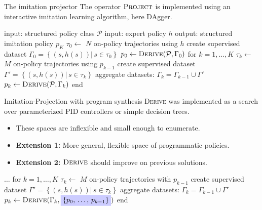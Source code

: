 \begin{frame}[fragile]{The imitation projector}
The operator $\textsc{Project}$ is implemented using an interactive imitation learning algorithm, here DAgger.

\begin{algorithm}[caption={$\textsc{Project}$: imitation learning}]
 input: structured policy class $\mathcal{P}$
 input: expert policy $h$
 output: structured imitation policy $p_K$
 $\tau_0 \leftarrow $ $N$ on-policy trajectories using $h$
 create supervised dataset $\Gamma_0 = \left\{\left(s, h(s)\right) |\, s \in \tau_0 \right\}$
 $p_0 \leftarrow \textsc{Derive}(\mathcal{P}, \Gamma_0)$
 for $k = 1, \dots, K$
   $\tau_k \leftarrow $ $M$ on-policy trajectories using $p_{k-1}$
   create supervised dataset $\Gamma' = \left\{\left(s, h(s)\right) |\, s \in \tau_k \right\}$
   aggregate datasets: $\Gamma_k = \Gamma_{k-1} \cup \Gamma' \quad$
   $p_k \leftarrow \textsc{Derive}(\mathcal{P}, \Gamma_k)$
 end
\end{algorithm}

\end{frame}




\begin{frame}[fragile]{Imitation-Projection with program synthesis}
\textsc{Derive} was implemented as a search over parameterized PID controllers or simple decision trees.

\begin{itemize}
    \item These spaces are inflexible and small enough to enumerate.
    \item \textbf{Extension 1:} More general, flexible space of programmatic policies.
    \item \textbf{Extension 2:} $\textsc{Derive}$ should improve on previous solutions.
\end{itemize}

\begin{algorithm}[caption={$\textsc{Project}$: imitation learning by improvement}]
 $\dots$
 for $k = 1, \dots, K$
   $\tau_k \leftarrow $ $M$ on-policy trajectories with $p_{k-1}$
   create supervised dataset $\Gamma' = \left\{\left(s, h(s)\right) |\, s \in \tau_k \right\}$
   aggregate datasets: $\Gamma_k = \Gamma_{k-1} \cup \Gamma' \quad$
   $p_k \leftarrow \textsc{Derive}(\Gamma_k, \highlight{\{p_0,\,\dots,\,p_{k-1}\}})$
 end
\end{algorithm}
\end{frame}

